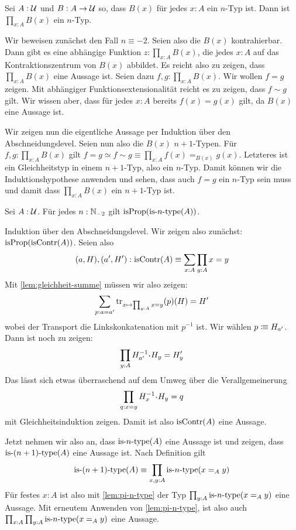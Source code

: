 \begin{lemma}
  \label{lem:pi-n-type}
  Sei $A:\mathcal{U}$ und $B:A\to\mathcal{U}$ so, dass $B(x)$ für jedes $x:A$ ein $n$-Typ ist.
  Dann ist $\prod_{x:A}B(x)$ ein $n$-Typ.
\end{lemma}
\begin{beweis}
  Wir beweisen zunächst den Fall $n\equiv -2$. Seien also die $B(x)$ kontrahierbar.
  Dann gibt es eine abhängige Funktion $z:\prod_{x:A}B(x)$, die jedes $x:A$ auf das Kontraktionszentrum von $B(x)$ abbildet.
  Es reicht also zu zeigen, dass $\prod_{x:A}B(x)$ eine Aussage ist.
  Seien dazu $f,g:\prod_{x:A}B(x)$. Wir wollen $f=g$ zeigen.
  Mit abhängiger Funktionsextensionalität reicht es zu zeigen, dass $f\sim g$ gilt.
  Wir wissen aber, dass für jedes $x:A$ bereits $f(x)=g(x)$ gilt, da $B(x)$ eine Aussage ist.

  Wir zeigen nun die eigentliche Aussage per Induktion über den Abschneidungslevel.
  Seien nun also die $B(x)$ $n+1$-Typen.
  Für $f,g:\prod_{x:A}B(x)$ gilt $f=g \simeq f\sim g \equiv \prod_{x:A}f(x)=_{B(x)}g(x)$.
  Letzteres ist ein Gleichheitstyp in einem $n+1$-Typ, also ein $n$-Typ.
  Damit können wir die Induktionshypothese anwenden und sehen, dass auch $f=g$ ein $n$-Typ sein muss und damit dass $\prod_{x:A}B(x)$ ein $n+1$-Typ ist.
\end{beweis}

\begin{lemma}
  \label{lem:isprop-hlevel}
  Sei $A:\mathcal{U}$. Für jedes $n:\mathbb{N}_{-2}$ gilt $\mathrm{isProp}(\mathrm{is}\mbox{-}{n}\mbox{-}\mathrm{type}(A))$.
\end{lemma}
\begin{beweis}
  Induktion über den Abschneidungslevel.
  Wir zeigen also zunächst: $\mathrm{isProp}(\mathrm{isContr}(A))$.
  Seien also
  \[
    (a,H),(a',H'):\mathrm{isContr}(A)\equiv\sum_{x:A}\prod_{y:A}x=y
  \]
  Mit \cref{lem:gleichheit-summe} müssen wir also zeigen:
  \[
    \sum_{p:a=a'}\mathrm{tr}_{x\mapsto \prod_{y:A}x=y}(p)(H)=H'
  \]
  wobei der Transport die Linkskonkatenation mit $p^{-1}$ ist.
  Wir wählen $p\vcentcolon\mspace{-1.2mu}\equiv H_{a'}$. Dann ist noch zu zeigen:
  \[
    \prod_{y:A}H_{a'}^{-1}\kon H_y=H'_y
  \]
  Das lässt sich etwas überraschend auf dem Umweg über die Verallgemeinerung
  \[
    \prod_{q:x=y}H_{x}^{-1}\kon H_y=q
  \]
  mit Gleichheitsinduktion zeigen. Damit ist also $\mathrm{isContr}(A)$ eine Aussage.

  Jetzt nehmen wir also an, dass $\mathrm{is}\mbox{-}{n}\mbox{-}\mathrm{type}(A)$ eine Aussage ist und zeigen, dass $\mathrm{is}\mbox{-}{(n+1)}\mbox{-}\mathrm{type}(A)$ eine Aussage ist.
  Nach Definition gilt
  \[
    \mathrm{is}\mbox{-}{(n+1)}\mbox{-}\mathrm{type}(A)\equiv \prod_{x,y:A}\mathrm{is}\mbox{-}{n}\mbox{-}\mathrm{type}(x=_A y)
  \]
  Für festes $x:A$ ist also mit \cref{lem:pi-n-type} der Typ $\prod_{y:A}\mathrm{is}\mbox{-}{n}\mbox{-}\mathrm{type}(x=_A y)$ eine Aussage.
  Mit erneutem Anwenden von \cref{lem:pi-n-type}, ist also auch $\prod_{x:A}\prod_{y:A}\mathrm{is}\mbox{-}{n}\mbox{-}\mathrm{type}(x=_A y)$ eine Aussage.
\end{beweis}


